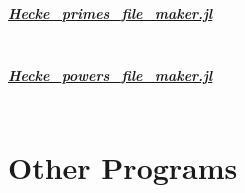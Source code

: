 \subparagraph{\href{https://github.com/pauldubois98/ModularFormsModuloTwo.jl/blob/master/src/data/Hecke_primes_file_maker.jl}{Hecke\_primes\_file\_maker.jl}}
\label{code:HeckePrimesFileMaker}
\inputminted[breaklines]{julia}{Module/HeckePrimesFileMaker.jl}

\subparagraph{\href{https://github.com/pauldubois98/ModularFormsModuloTwo.jl/blob/master/src/data/Hecke_powers_file_maker.jl}{Hecke\_powers\_file\_maker.jl}}
\label{code:HeckePowersFileMaker}
\inputminted[breaklines]{julia}{Module/HeckePowersFileMaker.jl}



\section{Other Programs}